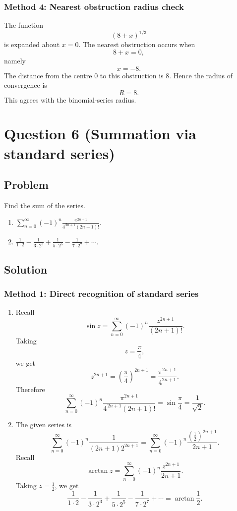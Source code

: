 \documentclass[12pt]{article}
\newcommand{\ds}{\displaystyle}
\begin{document}
\bigskip
\subsubsection{Method 4: Nearest obstruction radius check}

The function
\[
(8+x)^{1/3}
\]
is expanded about \(x=0\). The nearest obstruction occurs when
\[
8+x=0,
\]
namely
\[
x=-8.
\]
The distance from the centre \(0\) to this obstruction is \(8\). Hence the radius of
convergence is
\[
\boxed{R=8.}
\]
This agrees with the binomial-series radius.


\newpage
\section{Question 6 (Summation via standard series)}

\subsection{Problem}
Find the sum of the series.

\begin{enumerate}[label=(\alph*)]
  \item \(\ds \sum_{n=0}^{\infty}(-1)^n\frac{\pi^{2n+1}}{4^{\,2n+1}(2n+1)!}.\)
  \item \(\ds \frac{1}{1\cdot 2}-\frac{1}{3\cdot 2^3}+\frac{1}{5\cdot 2^5}-\frac{1}{7\cdot 2^7}+\cdots.\)
\end{enumerate}


\bigskip
\subsection{Solution}

\subsubsection{Method 1: Direct recognition of standard series}

\begin{enumerate}[label=(\alph*)]

\item
Recall
\[
\sin z
=
\sum_{n=0}^{\infty}(-1)^n\frac{z^{2n+1}}{(2n+1)!}.
\]
Taking
\[
z=\frac{\pi}{4},
\]
we get
\[
z^{2n+1}=\left(\frac{\pi}{4}\right)^{2n+1}
=
\frac{\pi^{2n+1}}{4^{2n+1}}.
\]
Therefore
\[
\sum_{n=0}^{\infty}(-1)^n\frac{\pi^{2n+1}}{4^{\,2n+1}(2n+1)!}
=
\sin\frac{\pi}{4}
=
\boxed{\frac{1}{\sqrt2}}.
\]

\item
The given series is
\[
\sum_{n=0}^{\infty}(-1)^n\frac{1}{(2n+1)2^{2n+1}}
=
\sum_{n=0}^{\infty}(-1)^n
\frac{\left(\frac12\right)^{2n+1}}{2n+1}.
\]
Recall
\[
\arctan z
=
\sum_{n=0}^{\infty}(-1)^n\frac{z^{2n+1}}{2n+1}.
\]
Taking \(z=\frac12\), we get
\[
\boxed{
\frac{1}{1\cdot 2}-\frac{1}{3\cdot 2^3}
+\frac{1}{5\cdot 2^5}
-\frac{1}{7\cdot 2^7}
+\cdots
=
\arctan\frac12.
}
\]

\end{enumerate}
\end{document}
